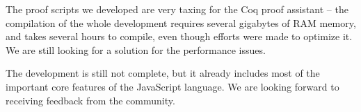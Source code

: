 \documentclass{sigplanconf}
\begin{document}
The proof scripts we developed are very taxing for the Coq
proof assistant -- the compilation of the whole development
requires several gigabytes of RAM memory, and takes several
hours to compile, even though efforts were made to optimize it.
We are still looking for a solution for the performance issues.

The development is still not complete, but it already
includes most of the important core features of the
JavaScript language. We are looking forward to receiving
feedback from the community.













\end{document}
